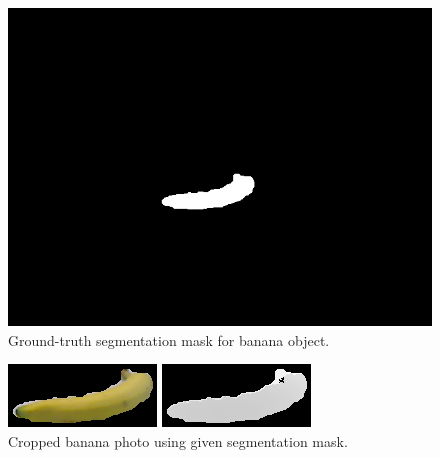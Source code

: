 \begin{figure}
    \centering
    \includegraphics[width=0.7\linewidth]{img/banana_1_1_1_mask.png}
    \caption{Ground-truth segmentation mask for banana object.}
    \label{fig:img_mask}
\end{figure}

\begin{figure}
    \centering
    \includegraphics[width=0.7\linewidth]{img/banana_1_1_1_crop.png}

    \vspace{0.4cm}
    \includegraphics[width=0.7\linewidth]{img/banana_1_1_1_depth_crop.png}
    \caption{Cropped banana photo using given segmentation mask.}
    \label{fig:img_cropped}
\end{figure}

